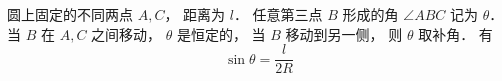
\begin{issues}
\issueDraft
\end{issues}

圆上固定的不同两点 $A,C$， 距离为 $l$． 任意第三点 $B$ 形成的角 $\angle ABC$ 记为 $\theta$． 当 $B$ 在 $A,C$ 之间移动， $\theta$ 是恒定的， 当 $B$ 移动到另一侧， 则 $\theta$ 取补角． 有
\begin{equation}\label{SphTri_eq1}
\sin\theta = \frac{l}{2R}
\end{equation}
